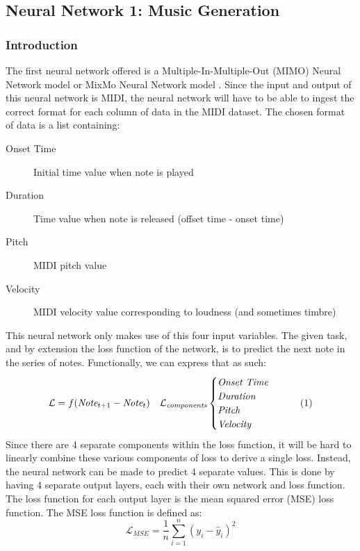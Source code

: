 \documentclass{article}
\newcommand\numberthis{\addtocounter{equation}{1}\tag{\theequation}}
\begin{document}
\subsection{Neural Network 1: Music Generation}
\label{sec:nn1}
\subsubsection{Introduction}
The first neural network offered is a Multiple-In-Multiple-Out (MIMO) Neural Network model \citep{ayomoh2012neural} or MixMo Neural Network model \citep{rame2021mixmo}. Since the input and output of this neural network is MIDI, the neural network will have to be able to ingest the correct format for each column of data in the MIDI dataset. The chosen format of data is a list containing:
\begin{description}
	\item[Onset Time] Initial time value when note is played
	\item[Duration] Time value when note is released (offset time - onset time)
	\item[Pitch] MIDI pitch value
	\item[Velocity] MIDI velocity value corresponding to loudness (and sometimes timbre)
\end{description}
This neural network only makes use of this four input variables. The given task, and by extension the loss function of the network, is to predict the next note in the series of notes. Functionally, we can express that as such:
\begin{align*}
	\label{eq:nn1}
	\mathcal{L} = f(\textit{Note}_{t+1} - \textit{Note}_{t})
	\quad \mathcal{L}_\textit{components}
	\begin{cases}
		\textit{Onset Time} \\
		\textit{Duration}   \\
		\textit{Pitch}      \\
		\textit{Velocity}
	\end{cases}
	\numberthis
\end{align*}
Since there are 4 separate components within the loss function, it will be hard to linearly combine these various components of loss to derive a single loss. Instead, the neural network can be made to predict 4 separate values. This is done by having 4 separate output layers, each with their own network and loss function. The loss function for each output layer is the mean squared error (MSE) loss function. The MSE loss function is defined as:
\begin{equation}
	\label{eq:mse}
	\mathcal{L}_\textit{MSE} = \frac{1}{n}\sum_{i=1}^{n}(y_i - \hat{y}_i)^2
\end{equation}
\end{document}

